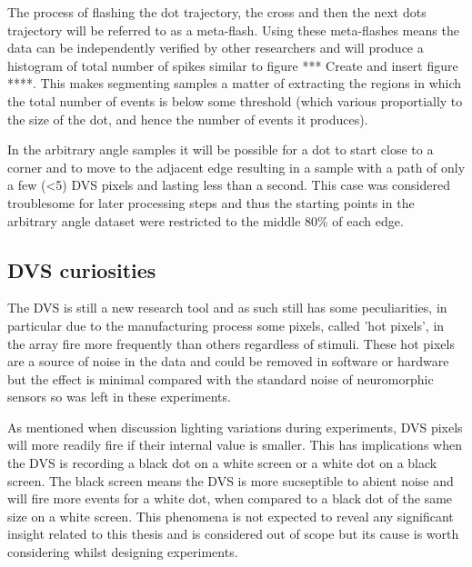 The process of flashing the dot trajectory, the cross and then the next dots trajectory will be referred to as a meta-flash. 
Using these meta-flashes means the data can be independently verified by other researchers and will produce a histogram of total number of spikes similar to figure *** Create and insert figure ****.
This makes segmenting samples a matter of extracting the regions in which the total number of events is below some threshold (which various proportially to the size of the dot, and hence the number of events it produces). 




In the arbitrary angle samples it will be possible for a dot to start close to a corner and to move to the adjacent edge resulting in a sample with a path of only a few (\textless 5) DVS pixels and lasting less than a second.
This case was considered troublesome for later processing steps and thus the starting points in the arbitrary angle dataset were restricted to the middle 80\% of each edge. 

\subsection{DVS curiosities}

The DVS is still a new research tool and as such still has some peculiarities, in particular due to the manufacturing process some pixels, called 'hot pixels', in the array fire more frequently than others regardless of stimuli. 
These hot pixels are a source of noise in the data and could be removed in software or hardware but the effect is minimal compared with the standard noise of neuromorphic sensors so was left in these experiments. 

As mentioned when discussion lighting variations during experiments, DVS pixels will more readily fire if their internal value is smaller.
This has implications when the DVS is recording a black dot on a white screen or a white dot on a black screen.
The black screen means the DVS is more sucseptible to abient noise and will fire more events for a white dot, when compared to a black dot of the same size on a white screen. 
This phenomena is not expected to reveal any significant insight related to this thesis and is considered out of scope but its cause is worth considering whilst designing experiments. 



